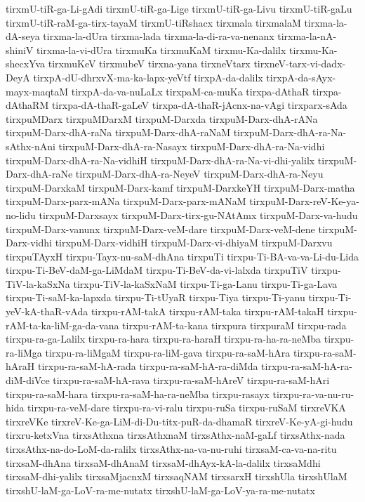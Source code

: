 {tirxmU-tiR-ga-Li-gAdi
tirxmU-tiR-ga-Lige
tirxmU-tiR-ga-Livu
tirxmU-tiR-gaLu
tirxmU-tiR-raM-ga-tirx-tayaM
tirxmU-tiRshacx
tirxmala
tirxmalaM
tirxma-la-dA-seya
tirxma-la-dUra
tirxma-lada
tirxma-la-di-ra-va-nenanx
tirxma-la-nA-shiniV
tirxma-la-vi-dUra
tirxmuKa
tirxmuKaM
tirxmu-Ka-dalilx
tirxmu-Ka-shecxYva
tirxmuKeV
tirxmubeV
tirxna-yana
tirxneVtarx
tirxneV-tarx-vi-dadx-DeyA
tirxpA-dU-dhrxvX-ma-ka-lapx-yeVtf
tirxpA-da-dalilx
tirxpA-da-sAyx-mayx-maqtaM
tirxpA-da-va-nuLaLx
tirxpaM-ca-muKa
tirxpa-dAthaR
tirxpa-dAthaRM
tirxpa-dA-thaR-gaLeV
tirxpa-dA-thaR-jAcnx-na-vAgi
tirxparx-sAda
tirxpuMDarx
tirxpuMDarxM
tirxpuM-Darxda
tirxpuM-Darx-dhA-rANa
tirxpuM-Darx-dhA-raNa
tirxpuM-Darx-dhA-raNaM
tirxpuM-Darx-dhA-ra-Na-sAthx-nAni
tirxpuM-Darx-dhA-ra-Nasayx
tirxpuM-Darx-dhA-ra-Na-vidhi
tirxpuM-Darx-dhA-ra-Na-vidhiH
tirxpuM-Darx-dhA-ra-Na-vi-dhi-yalilx
tirxpuM-Darx-dhA-raNe
tirxpuM-Darx-dhA-ra-NeyeV
tirxpuM-Darx-dhA-ra-Neyu
tirxpuM-DarxkaM
tirxpuM-Darx-kamf
tirxpuM-DarxkeYH
tirxpuM-Darx-matha
tirxpuM-Darx-parx-mANa
tirxpuM-Darx-parx-mANaM
tirxpuM-Darx-reV-Ke-ya-no-lidu
tirxpuM-Darxsayx
tirxpuM-Darx-tirx-gu-NAtAmx
tirxpuM-Darx-va-hudu
tirxpuM-Darx-vanunx
tirxpuM-Darx-veM-dare
tirxpuM-Darx-veM-dene
tirxpuM-Darx-vidhi
tirxpuM-Darx-vidhiH
tirxpuM-Darx-vi-dhiyaM
tirxpuM-Darxvu
tirxpuTAyxH
tirxpu-Tayx-nu-saM-dhAna
tirxpuTi
tirxpu-Ti-BA-va-va-Li-du-Lida
tirxpu-Ti-BeV-daM-ga-LiMdaM
tirxpu-Ti-BeV-da-vi-lalxda
tirxpuTiV
tirxpu-TiV-la-kaSxNa
tirxpu-TiV-la-kaSxNaM
tirxpu-Ti-ga-Lanu
tirxpu-Ti-ga-Lava
tirxpu-Ti-saM-ka-lapxda
tirxpu-Ti-tUyaR
tirxpu-Tiya
tirxpu-Ti-yanu
tirxpu-Ti-yeV-kA-thaR-vAda
tirxpu-rAM-takA
tirxpu-rAM-taka
tirxpu-rAM-takaH
tirxpu-rAM-ta-ka-liM-ga-da-vana
tirxpu-rAM-ta-kana
tirxpura
tirxpuraM
tirxpu-rada
tirxpu-ra-ga-Lalilx
tirxpu-ra-hara
tirxpu-ra-haraH
tirxpu-ra-ha-ra-neMba
tirxpu-ra-liMga
tirxpu-ra-liMgaM
tirxpu-ra-liM-gava
tirxpu-ra-saM-hAra
tirxpu-ra-saM-hAraH
tirxpu-ra-saM-hA-rada
tirxpu-ra-saM-hA-ra-diMda
tirxpu-ra-saM-hA-ra-diM-diVce
tirxpu-ra-saM-hA-rava
tirxpu-ra-saM-hAreV
tirxpu-ra-saM-hAri
tirxpu-ra-saM-hara
tirxpu-ra-saM-ha-ra-neMba
tirxpu-rasayx
tirxpu-ra-va-nu-ru-hida
tirxpu-ra-veM-dare
tirxpu-ra-vi-ralu
tirxpu-ruSa
tirxpu-ruSaM
tirxreVKA
tirxreVKe
tirxreV-Ke-ga-LiM-di-Du-titx-puR-da-dhamaR
tirxreV-Ke-yA-gi-hudu
tirxru-ketxVna
tirxsAthxna
tirxsAthxnaM
tirxsAthx-naM-gaLf
tirxsAthx-nada
tirxsAthx-na-do-LoM-da-ralilx
tirxsAthx-na-va-nu-ruhi
tirxsaM-ca-va-na-ritu
tirxsaM-dhAna
tirxsaM-dhAnaM
tirxsaM-dhAyx-kA-la-dalilx
tirxsaMdhi
tirxsaM-dhi-yalilx
tirxsaMjacnxM
tirxsaqNAM
tirxsarxH
tirxshUla
tirxshUlaM
tirxshU-laM-ga-LoV-ra-me-nutatx
tirxshU-laM-ga-LoV-ya-ra-me-nutatx
}
